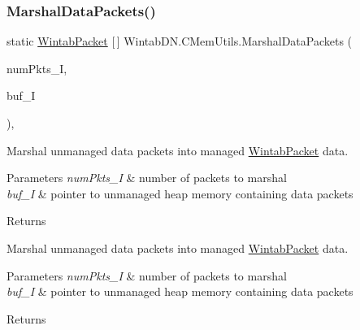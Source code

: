 \subsubsection{\texorpdfstring{Marshal\+Data\+Packets()}{MarshalDataPackets()}}
{\footnotesize\ttfamily static \mbox{\hyperlink{struct_wintab_d_n_1_1_wintab_packet}{Wintab\+Packet}} \mbox{[}$\,$\mbox{]} Wintab\+D\+N.\+C\+Mem\+Utils.\+Marshal\+Data\+Packets (\begin{DoxyParamCaption}\item[{U\+Int32}]{num\+Pkts\+\_\+I,  }\item[{Int\+Ptr}]{buf\+\_\+I }\end{DoxyParamCaption})\hspace{0.3cm}{\ttfamily [inline]}, {\ttfamily [static]}}



Marshal unmanaged data packets into managed \mbox{\hyperlink{struct_wintab_d_n_1_1_wintab_packet}{Wintab\+Packet}} data. 


\begin{DoxyParams}{Parameters}
{\em num\+Pkts\+\_\+I} & number of packets to marshal\\
\hline
{\em buf\+\_\+I} & pointer to unmanaged heap memory containing data packets\\
\hline
\end{DoxyParams}
\begin{DoxyReturn}{Returns}

\end{DoxyReturn}


Marshal unmanaged data packets into managed \mbox{\hyperlink{struct_wintab_d_n_1_1_wintab_packet}{Wintab\+Packet}} data. 


\begin{DoxyParams}{Parameters}
{\em num\+Pkts\+\_\+I} & number of packets to marshal\\
\hline
{\em buf\+\_\+I} & pointer to unmanaged heap memory containing data packets\\
\hline
\end{DoxyParams}
\begin{DoxyReturn}{Returns}

\end{DoxyReturn}
\mbox{\label{class_wintab_d_n_1_1_c_mem_utils_a1de9ef858542278844e26f8fb4963e02}} 
